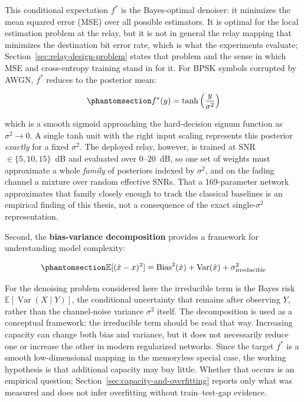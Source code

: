 This conditional expectation \(f^*\) is the Bayes-optimal denoiser: it minimizes the mean squared error (MSE) over all possible estimators. It is optimal for the local estimation problem at the relay, but it is not in general the relay mapping that minimizes the destination bit error rate, which is what the experiments evaluate; Section~\ref{sec:relay-design-problem} states that problem and the sense in which MSE and cross-entropy training stand in for it. For BPSK symbols corrupted by AWGN, \(f^*\) reduces to the posterior mean:

\begin{equation}\protect\phantomsection\label{eq:optimal-denoiser-awgn}{f^*(y) = \tanh\left(\frac{y}{\sigma^2}\right)
}\end{equation}

which is a smooth sigmoid approaching the hard-decision signum function as \(\sigma^2 \to 0\). A single tanh unit with the right input scaling represents this posterior \emph{exactly} for a fixed \(\sigma^2\). The deployed relay, however, is trained at SNR \(\in\{5,10,15\}\)~dB and evaluated over \(0\)--\(20\)~dB, so one set of weights must approximate a whole \emph{family} of posteriors indexed by \(\sigma^2\), and on the fading channel a mixture over random effective SNRs. That a 169-parameter network approximates that family closely enough to track the classical baselines is an empirical finding of this thesis, not a consequence of the exact single-\(\sigma^2\) representation.

Second, the \textbf{bias-variance decomposition} provides a framework for understanding model complexity:

\begin{equation}\protect\phantomsection\label{eq:bias-variance-decomp}{\mathbb{E}[(\hat{x} - x)^2] = \text{Bias}^2(\hat{x}) + \text{Var}(\hat{x}) + \sigma^2_{\text{irreducible}}
}\end{equation}

For the denoising problem considered here the irreducible term is the Bayes risk $\mathbb{E}[\operatorname{Var}(X \mid Y)]$, the conditional uncertainty that remains after observing $Y$, rather than the channel-noise variance $\sigma^2$ itself. The decomposition is used as a conceptual framework; the irreducible term should be read that way. Increasing capacity can change both bias and variance, but it does not necessarily reduce one or increase the other in modern regularized networks. Since the target \(f^*\) is a smooth low-dimensional mapping in the memoryless special case, the working hypothesis is that additional capacity may buy little. Whether that occurs is an empirical question; Section~\ref{sec:capacity-and-overfitting} reports only what was measured and does not infer overfitting without train--test-gap evidence.

